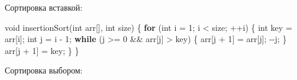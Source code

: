 \documentclass[
]{article}
\newenvironment{Shaded}{}{}
\newcommand{\ControlFlowTok}[1]{\textcolor[rgb]{0.00,0.44,0.13}{\textbf{#1}}}
\newcommand{\DataTypeTok}[1]{\textcolor[rgb]{0.56,0.13,0.00}{#1}}
\newcommand{\DecValTok}[1]{\textcolor[rgb]{0.25,0.63,0.44}{#1}}
\newcommand{\NormalTok}[1]{#1}
\newcommand{\OperatorTok}[1]{\textcolor[rgb]{0.40,0.40,0.40}{#1}}
\begin{document}
\begin{enumerate}
  Сортировка вставкой:

\begin{Shaded}
\begin{Highlighting}[]
\DataTypeTok{void}\NormalTok{ insertionSort}\OperatorTok{(}\DataTypeTok{int}\NormalTok{ arr}\OperatorTok{[],} \DataTypeTok{int}\NormalTok{ size}\OperatorTok{)} \OperatorTok{\{}
    \ControlFlowTok{for} \OperatorTok{(}\DataTypeTok{int}\NormalTok{ i }\OperatorTok{=} \DecValTok{1}\OperatorTok{;}\NormalTok{ i }\OperatorTok{\textless{}}\NormalTok{ size}\OperatorTok{;} \OperatorTok{++}\NormalTok{i}\OperatorTok{)} \OperatorTok{\{}
        \DataTypeTok{int}\NormalTok{ key }\OperatorTok{=}\NormalTok{ arr}\OperatorTok{[}\NormalTok{i}\OperatorTok{];}
        \DataTypeTok{int}\NormalTok{ j }\OperatorTok{=}\NormalTok{ i }\OperatorTok{{-}} \DecValTok{1}\OperatorTok{;}
        \ControlFlowTok{while} \OperatorTok{(}\NormalTok{j }\OperatorTok{\textgreater{}=} \DecValTok{0} \OperatorTok{\&\&}\NormalTok{ arr}\OperatorTok{[}\NormalTok{j}\OperatorTok{]} \OperatorTok{\textgreater{}}\NormalTok{ key}\OperatorTok{)} \OperatorTok{\{}
\NormalTok{            arr}\OperatorTok{[}\NormalTok{j }\OperatorTok{+} \DecValTok{1}\OperatorTok{]} \OperatorTok{=}\NormalTok{ arr}\OperatorTok{[}\NormalTok{j}\OperatorTok{];}
            \OperatorTok{{-}{-}}\NormalTok{j}\OperatorTok{;}
        \OperatorTok{\}}
\NormalTok{        arr}\OperatorTok{[}\NormalTok{j }\OperatorTok{+} \DecValTok{1}\OperatorTok{]} \OperatorTok{=}\NormalTok{ key}\OperatorTok{;}
    \OperatorTok{\}}
\OperatorTok{\}}
\end{Highlighting}
\end{Shaded}

  Сортировка выбором:


\end{enumerate}
\end{document}
